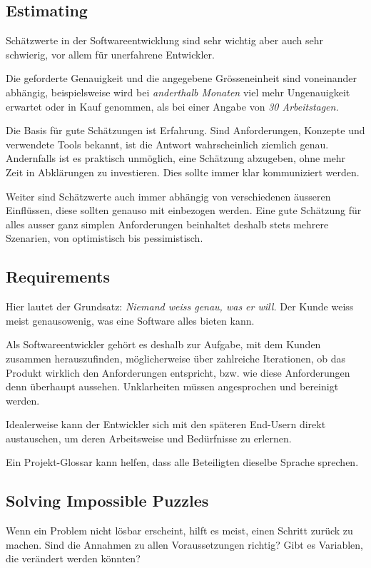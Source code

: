 \documentclass[10pt, oneside]{article}
\begin{document}
\subsection{Estimating}
Schätzwerte in der Softwareentwicklung sind sehr wichtig aber auch sehr schwierig, vor allem für unerfahrene Entwickler.

Die geforderte Genauigkeit und die angegebene Grösseneinheit sind voneinander abhängig, beispielsweise wird bei \emph{anderthalb Monaten} viel mehr Ungenauigkeit
erwartet oder in Kauf genommen, als bei einer Angabe von \emph{30 Arbeitstagen.}

Die Basis für gute Schätzungen ist Erfahrung. Sind Anforderungen, Konzepte und verwendete Tools bekannt, ist die Antwort wahrscheinlich ziemlich genau.
Andernfalls ist es praktisch unmöglich, eine Schätzung abzugeben, ohne mehr Zeit in Abklärungen zu investieren. Dies sollte immer klar kommuniziert werden.

Weiter sind Schätzwerte auch immer abhängig von verschiedenen äusseren Einflüssen, diese sollten genauso mit einbezogen werden. 
Eine gute Schätzung für alles ausser ganz simplen Anforderungen beinhaltet deshalb stets mehrere Szenarien, von optimistisch bis pessimistisch.

\subsection{Requirements}
Hier lautet der Grundsatz: \emph{Niemand weiss genau, was er will.}
Der Kunde weiss meist genausowenig, was eine Software alles bieten kann. 

Als Softwareentwickler gehört es deshalb zur Aufgabe, mit dem Kunden zusammen herauszufinden, möglicherweise über zahlreiche Iterationen, 
ob das Produkt wirklich den Anforderungen entspricht, bzw. wie diese Anforderungen denn überhaupt aussehen. 
Unklarheiten müssen angesprochen und bereinigt werden. 

Idealerweise kann der Entwickler sich mit den späteren End-Usern direkt austauschen, um deren Arbeitsweise und Bedürfnisse zu erlernen.

Ein Projekt-Glossar kann helfen, dass alle Beteiligten dieselbe Sprache sprechen.

\subsection{Solving Impossible Puzzles}
Wenn ein Problem nicht lösbar erscheint, hilft es meist, einen Schritt zurück zu machen. Sind die Annahmen zu allen Voraussetzungen richtig?
Gibt es Variablen, die verändert werden könnten?
\end{document}
